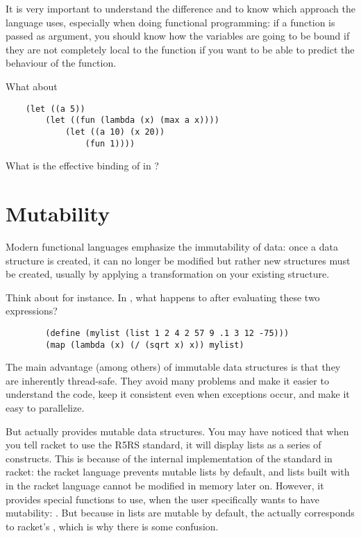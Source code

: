 \documentclass{../../../tp}
\begin{document}
It is very important to understand the difference and to know which approach the language uses, especially when doing functional programming: if a function is passed as argument, you should know how the variables are going to be bound if they are not completely local to the function if you want to be able to predict the behaviour of the function.

\begin{instruction}
	
	What about 
	
	\begin{verbatim}
	(let ((a 5)) 
		(let ((fun (lambda (x) (max a x))))
			(let ((a 10) (x 20))
				(fun 1))))
	\end{verbatim}
	
	What is the effective binding of  in ? 
	
\end{instruction}


\section{Mutability}

Modern functional languages emphasize the immutability of data: once a data structure is created, it can no longer be modified but rather new structures must be created, usually by applying a transformation on your existing structure.

\begin{instruction} 
	Think about  for instance. In \scheme, what happens to  after evaluating these two expressions?
	
	\begin{verbatim}
		(define (mylist (list 1 2 4 2 57 9 .1 3 12 -75)))
		(map (lambda (x) (/ (sqrt x) x)) mylist)
	\end{verbatim}

\end{instruction}

The main advantage (among others) of immutable data structures is that they are inherently thread-safe. They avoid many problems and make it easier to understand the code, keep it consistent even when exceptions occur, and make it easy to parallelize. 

But \scheme actually provides mutable data structures. You may have noticed that when you tell racket to use the R5RS standard, it will display lists as a series of  constructs. This is because of the internal implementation of the \scheme standard in racket: the racket language prevents mutable lists by default, and lists built with  in the racket language cannot be modified in memory later on. However, it provides special functions to use, when the user specifically wants to have mutability: . But because in \scheme lists are mutable by default, the \scheme {} actually corresponds to racket's , which is why there is some confusion.
\end{document}
